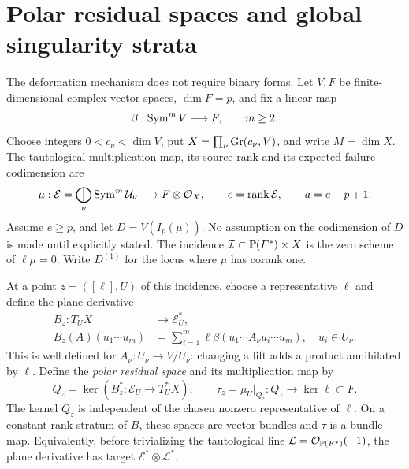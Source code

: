 \section{Polar residual spaces and global singularity strata}
\label{sec:polar-residual}
The deformation mechanism does not require binary forms. Let $V,F$ be
finite-dimensional complex vector spaces, $\dim F=p$, and fix a linear map
\[
 \beta:\operatorname{Sym}^m V\longrightarrow F,\qquad m\ge2.
\]
Choose integers $0<c_\nu<\dim V$, put
$X=\prod_\nu\operatorname{Gr}(c_\nu,V)$, and write $M=\dim X$. The tautological
multiplication map, its source rank and its expected failure codimension are
\[
 \mu:\mathcal E=\bigoplus_\nu\operatorname{Sym}^m\mathcal U_\nu
       \longrightarrow F\otimes\mathcal O_X,
 \qquad e=\operatorname{rank}\mathcal E,\qquad a=e-p+1.
\]
Assume $e\ge p$, and let $D=V(I_p(\mu))$. No assumption on the
codimension of $D$ is made until explicitly stated. The incidence
$\mathcal I\subset\mathbb P(F^*)\times X$ is the zero scheme of
$\ell\mu=0$. Write $D^{(1)}$ for the locus where $\mu$ has corank one.

At a point $z=([\ell],U)$ of this incidence, choose a representative
$\ell$ and define the plane derivative
\begin{equation}\label{eq:polar-plane-derivative}
 \begin{split}
 B_z:T_UX&\longrightarrow\mathcal E_U^*,\\
 B_z(A)(u_1\cdots u_m)
   &=\sum_{i=1}^m\ell\beta(u_1\cdots A_\nu u_i\cdots u_m),
       \quad u_i\in U_\nu.
 \end{split}
\end{equation}
This is well defined for $A_\nu:U_\nu\to V/U_\nu$: changing a lift
adds a product annihilated by $\ell$. Define the \emph{polar residual space}
and its multiplication map by
\begin{equation}\label{eq:polar-residual-space}
 Q_z=\ker(B_z^*:\mathcal E_U\longrightarrow T_U^*X),
 \qquad \tau_z=\mu_U|_{Q_z}:Q_z\longrightarrow\ker\ell\subset F.
\end{equation}
The kernel $Q_z$ is independent of the chosen nonzero representative
of $\ell$. On a constant-rank stratum of $B$, these spaces are vector
bundles and $\tau$ is a bundle map. Equivalently, before trivializing
the tautological line $\mathcal L=\mathcal O_{\mathbb P(F^*)}(-1)$, the
plane derivative has target $\mathcal E^*\otimes\mathcal L^*$.

